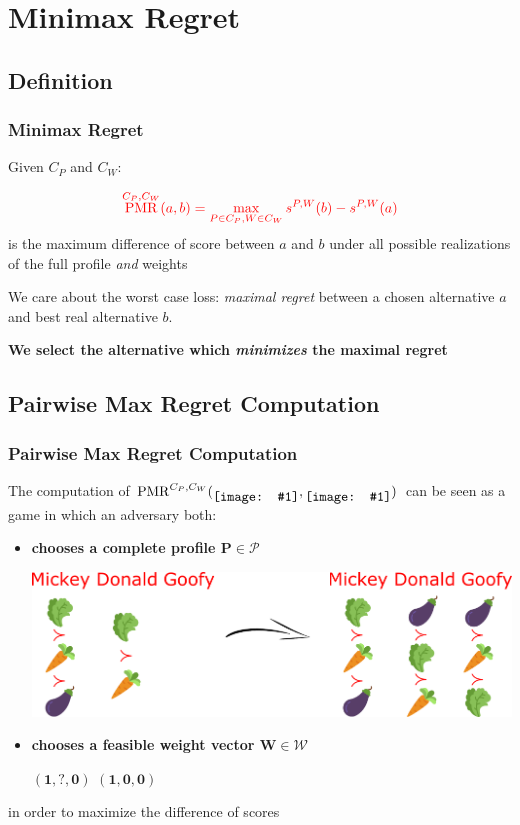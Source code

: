 \documentclass{beamer}
\DeclareMathOperator{\PMR}{PMR}
\newcommand*{\icimg}[1]{%
	\raisebox{-.3\baselineskip}{%
		\texttt{[image: \#1]}%
	}%
}
\newcommand*{\icarr}[1]{%
	\raisebox{-0.4\baselineskip}{%
		\texttt{[image: \#1]}%
	}%
}
\begin{document}
\section{Minimax Regret}
\subsection{Definition}
\begin{frame}
	\frametitle{Minimax Regret}
	Given $C_P$ and $C_W$:
	
	\begin{block}{}
		\[\color{red}{\PMR^{C_P,C_W}(a,b)}= \max_{P\in C_P, W \in C_W} s^{P,W}(b)-s^{P,W}(a) \]
		is the maximum difference of score between $a$ and $b$ under all possible realizations of the full profile {\em and} weights
	\end{block}
	
	We care about the worst case loss: \emph{maximal regret} between a chosen alternative $a$ and best real alternative $b$. \bigskip
	
	\centerline{\textbf{We select the alternative which \emph{minimizes} the maximal regret}}
\end{frame}

\subsection{Pairwise Max Regret Computation}
\begin{frame}
	\frametitle{Pairwise Max Regret Computation}
	The computation of $\PMR^{C_P,C_W}( \icimg{salad.png},\icimg{aubergine.png})$ can be seen as a game in which an adversary both:
	\begin{itemize}
		\item \textbf{chooses a complete profile $\mathbf{P \in \mathcal{P}}$}\\
		\medskip
		\begin{center}
			\includegraphics[scale=0.35]{completion4.png}
		\end{center}
		
		\item \textbf{chooses a feasible weight vector $\mathbf{W \in \mathcal{W}}$}\\
		\medskip
		\centerline{\color{red}$\mathbf{(1,?,0)}$ \icarr{arrow.png} \color{red}$\mathbf{(1,0,0)}$}
	\end{itemize}
	\medskip
	in order to maximize the difference of scores
\end{frame}
\end{document}
